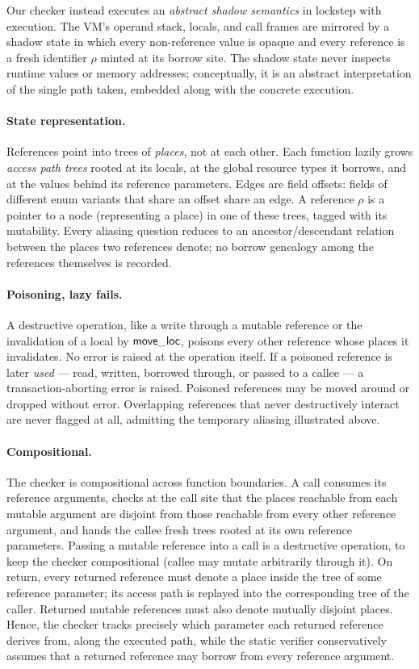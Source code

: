 Our checker instead executes an \emph{abstract shadow semantics} in lockstep with execution.
The VM's operand stack, locals, and call frames are mirrored by a shadow state in which every non-reference value is opaque and every reference is a fresh identifier $\rho$ minted at its borrow site.
The shadow state never inspects runtime values or memory addresses; conceptually, it is an abstract interpretation of the single path taken, embedded along with the concrete execution.

\paragraph{State representation.} References point into trees of \emph{places}, not at each other.
Each function lazily grows \emph{access path trees} rooted at its locals, at the global resource types it borrows, and at the values behind its reference parameters.
Edges are field offsets: fields of different enum variants that share an offset share an edge.
A reference $\rho$ is a pointer to a node (representing a place) in one of these trees, tagged with its mutability.
Every aliasing question reduces to an ancestor/descendant relation between the places two references denote; no borrow genealogy among the references themselves is recorded.

\paragraph{Poisoning, lazy fails.}
A destructive operation, like a write through a mutable reference or the invalidation of a local by $\mathop{\mathstrut{\mathsf{move\_loc}}}\nolimits$, poisons every other reference whose places it invalidates.
No error is raised at the operation itself.
If a poisoned reference is later \emph{used} --- read, written, borrowed through, or passed to a callee --- a transaction-aborting error is raised.
Poisoned references may be moved around or dropped without error.
Overlapping references that never destructively interact are never flagged at all, admitting the temporary aliasing illustrated above.

\paragraph{Compositional.} The checker is compositional across function boundaries.
A call consumes its reference arguments, checks at the call site that the places reachable from each mutable argument are disjoint from those reachable from every other reference argument, and hands the callee fresh trees rooted at its own reference parameters.
Passing a mutable reference into a call is a destructive operation, to keep the checker compositional (callee may mutate arbitrarily through it).
On return, every returned reference must denote a place inside the tree of some reference parameter; its access path is replayed into the corresponding tree of the caller.
Returned mutable references must also denote mutually disjoint places.
Hence, the checker tracks precisely which parameter each returned reference derives from, along the executed path, while the static verifier conservatively assumes that a returned reference may borrow from every reference argument.

